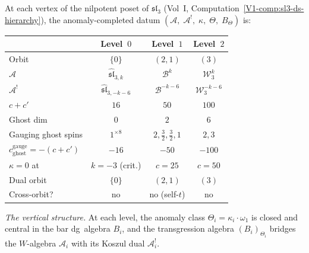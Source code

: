 \begin{construction}
At each vertex of the nilpotent poset of $\mathfrak{sl}_3$
(Vol~I, Computation~\ref*{V1-comp:sl3-ds-hierarchy}), the
anomaly-completed datum
$(\mathcal A,\;\mathcal A^!,\;\kappa,\;\Theta,\;B_\Theta)$
is:
\begin{center}
\renewcommand{\arraystretch}{1.3}
\begin{tabular}{lccc}
& \textbf{Level~$0$} & \textbf{Level~$1$} & \textbf{Level~$2$} \\
\hline
Orbit & $\{0\}$ & $(2,1)$ & $(3)$ \\[2pt]
$\mathcal A$ &
 $\widehat{\mathfrak{sl}}_{3,k}$ &
 $\mathcal B^k$ &
 $\mathcal W_3^k$ \\[2pt]
$\mathcal A^!$ &
 $\widehat{\mathfrak{sl}}_{3,-k-6}$ &
 $\mathcal B^{-k-6}$ &
 $\mathcal W_3^{-k-6}$ \\[2pt]
$c+c'$ & $16$ & $50$ & $100$ \\[2pt]
Ghost dim & $0$ & $2$ & $6$ \\[2pt]
Gauging ghost spins &
 $1^{\times 8}$ &
 $2, \tfrac32, \tfrac32, 1$ &
 $2, 3$ \\[2pt]
$c^{\mathrm{gauge}}_{\mathrm{ghost}} = -(c+c')$ &
 $-16$ &
 $-50$ &
 $-100$ \\[2pt]
$\kappa=0$ at & $k=-3$ (crit.) &
 $c=25$ & $c=50$ \\[2pt]
Dual orbit & $\{0\}$ & $(2,1)$ & $(3)$ \\[2pt]
Cross-orbit? & no & no (self-$t$) & no
\end{tabular}
\end{center}

\emph{The vertical structure.}
At each level, the anomaly class $\Theta_i=\kappa_i\cdot\omega_1$
is closed and central in the bar dg~algebra $B_i$, and the
transgression algebra $(B_i)_{\Theta_i}$ bridges the
$W$-algebra $\mathcal A_i$ with its Koszul dual
$\mathcal A_i^!$.


\end{construction}
